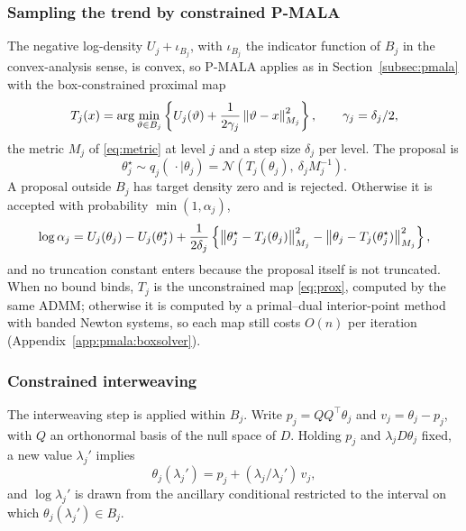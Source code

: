 \subsubsection{Sampling the trend by constrained P-MALA}

The negative log-density $U_j + \iota_{B_j}$, with $\iota_{B_j}$ the indicator function of $B_j$ in the convex-analysis sense, is convex, so P-MALA applies as in Section~\ref{subsec:pmala} with the box-constrained proximal map
\begin{equation}
    T_j(x) = \arg\min_{\vartheta\in B_j}
             \left\{U_j(\vartheta)+\frac{1}{2\gamma_j}\left\lVert\vartheta-x\right\rVert_{M_j}^2\right\},
             \qquad \gamma_j=\delta_j/2,
    \label{eq:joint_prox}
\end{equation}
the metric $M_j$ of \eqref{eq:metric} at level $j$ and a step size $\delta_j$ per level. The proposal is
\begin{equation}
    \theta_j^\star \sim q_j(\,\cdot\mid\theta_j) = \mathcal N\!\left(T_j(\theta_j),\ \delta_jM_j^{-1}\right).
    \label{eq:joint_proposal}
\end{equation}
A proposal outside $B_j$ has target density zero and is rejected. Otherwise it is accepted with probability $\min(1,\alpha_j)$,
\begin{equation}
    \log\alpha_j = U_j(\theta_j)-U_j(\theta_j^\star)
    +\frac{1}{2\delta_j}\left\{\left\lVert\theta_j^\star-T_j(\theta_j)\right\rVert_{M_j}^2
            -\left\lVert\theta_j-T_j(\theta_j^\star)\right\rVert_{M_j}^2\right\},
    \label{eq:joint_accept}
\end{equation}
and no truncation constant enters because the proposal itself is not truncated. When no bound binds, $T_j$ is the unconstrained map \eqref{eq:prox}, computed by the same ADMM; otherwise it is computed by a primal--dual interior-point method with banded Newton systems, so each map still costs $O(n)$ per iteration (Appendix~\ref{app:pmala:boxsolver}).

\subsubsection{Constrained interweaving}

The interweaving step is applied within $B_j$. Write $p_j=QQ^\top\theta_j$ and $v_j=\theta_j-p_j$, with $Q$ an orthonormal basis of the null space of $D$. Holding $p_j$ and $\lambda_jD\theta_j$ fixed, a new value $\lambda_j'$ implies
\begin{equation}
    \theta_j(\lambda_j')=p_j+(\lambda_j/\lambda_j')\,v_j ,
    \label{eq:joint_asis_curve}
\end{equation}
and $\log\lambda_j'$ is drawn from the ancillary conditional restricted to the interval on which $\theta_j(\lambda_j')\in B_j$.

